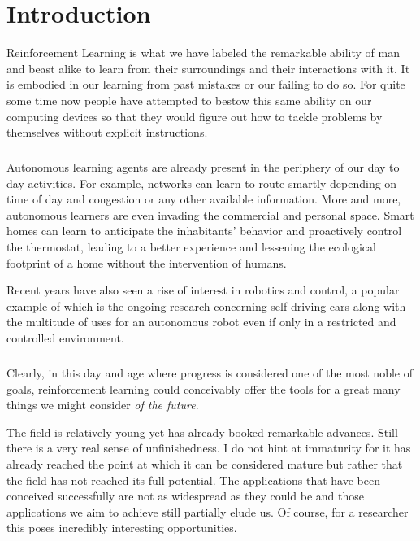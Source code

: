 \chapter{Introduction}

\label{introduction}
Reinforcement Learning is what we have labeled the remarkable ability of man and beast alike
to learn from their surroundings and their interactions with it.
It is embodied in our learning from past mistakes or our failing to do so.
For quite some time now people have attempted to bestow this same ability on
our computing devices so that they would figure out how to tackle problems by themselves
without explicit instructions.

\paragraph{}
Autonomous learning agents are already present
in the periphery of our day to day activities.
For example,
networks can learn to route smartly
depending on time of day
and congestion
or any other available information.
More and more,
autonomous learners are even invading
the commercial and personal space.
Smart homes can learn to anticipate the inhabitants'
behavior and proactively control the thermostat,
leading to a better experience
and lessening the ecological footprint of a home
without the intervention of humans.

Recent years have also seen a rise of interest
in robotics and control,
a popular example of which is the ongoing research
concerning self-driving cars
along with the multitude of uses for an autonomous robot
even if only in a restricted and controlled environment.

\paragraph{}
Clearly,
in this day and age
where progress is considered
one of the most noble of goals,
reinforcement learning could conceivably
offer the tools
for a great many things
we might consider \textit{of the future}.

The field is relatively young
yet has already booked remarkable advances.
Still there is a very real sense of unfinishedness.
I do not hint at immaturity
for it has already reached the point
at which it can be considered mature
but rather that the field has not reached its full potential.
The applications that have been conceived successfully
are not as widespread as they could be
and those applications we aim to achieve
still partially elude us.
Of course, for a researcher
this poses incredibly interesting opportunities.

